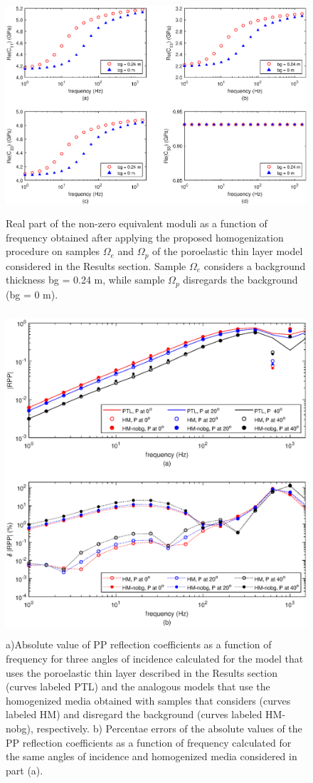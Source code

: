 \documentclass[draft]{agujournal2019}
\begin{document}
\begin{figure}[!ht]
\centering
        \includegraphics[width= 120mm, height=80mm]{cijbgcompare_2sandshaleU.eps}
\caption{Real part of the non-zero equivalent moduli as a function of frequency obtained after applying the proposed homogenization procedure on samples $\Omega_e$ and $\Omega_p$ of the poroelastic thin layer model considered in the Results section. Sample $\Omega_e$ considers a background thickness bg = 0.24 m, while sample $\Omega_p$ disregards the background (bg = 0 m). }
\label{fig.4}
\end{figure}

\begin{figure}[!ht]
\centering
        \includegraphics[width= 120mm, height=120mm]{rppbgcompare_2sandshaleUL12.eps}
\caption{a)Absolute value of PP reflection coefficients as a function of frequency for three angles of incidence calculated for the model that uses the poroelastic thin layer described in the Results section (curves labeled PTL) and the analogous models that use the homogenized media obtained with samples that considers (curves labeled HM) and disregard the background (curves labeled HM-nobg), respectively.  b) Percentae errors of the absolute values of the PP reflection coefficients as a function of frequency calculated for the same angles of incidence and homogenized media considered in part (a).} 
\label{fig.5}
\end{figure}
\end{document}
